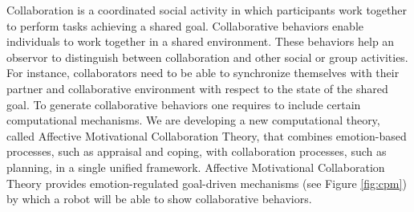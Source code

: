 \documentclass[letterpaper]{article}
\begin{document}
Collaboration is a coordinated social activity in which participants work
together to perform tasks achieving a shared goal. Collaborative behaviors
enable individuals to work together in a shared environment. These behaviors
help an observor to distinguish between collaboration and other social or
group activities. For instance, collaborators need to be able to synchronize
themselves with their partner and collaborative environment with respect to the
state of the shared goal. To generate collaborative behaviors one requires to
include certain computational mechanisms. We are developing a new computational
theory, called Affective Motivational Collaboration Theory, that combines
emotion-based processes, such as appraisal and coping, with collaboration
processes, such as planning, in a single unified framework. Affective
Motivational Collaboration Theory provides emotion-regulated goal-driven
mechanisms (see Figure \ref{fig:cpm}) by which a robot will be able to show
collaborative behaviors.



\end{document}

